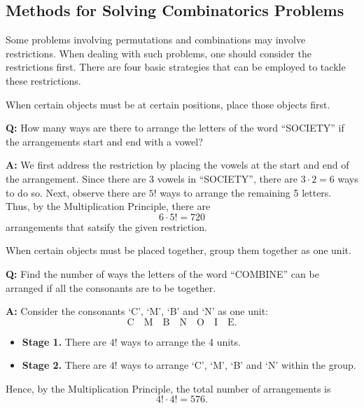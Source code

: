 \subsection{Methods for Solving Combinatorics Problems}

Some problems involving permutations and combinations may involve restrictions. When dealing with such problems, one should consider the restrictions first. There are four basic strategies that can be employed to tackle these restrictions.

\begin{method}
    When certain objects must be at certain positions, place those objects first.
\end{method}

\begin{example}
    \phantom{.}
    
    \textbf{Q:} How many ways are there to arrange the letters of the word ``SOCIETY'' if the arrangements start and end with a vowel?
    
    \textbf{A:} We first address the restriction by placing the vowels at the start and end of the arrangement. Since there are 3 vowels in ``SOCIETY'', there are $3 \cdot 2 = 6$ ways to do so. Next, observe there are $5!$ ways to arrange the remaining 5 letters. Thus, by the Multiplication Principle, there are \[6 \cdot 5! = 720\] arrangements that satsify the given restriction.
\end{example}

\begin{method}
    When certain objects must be placed together, group them together as one unit.
\end{method}

\begin{example}
    \phantom{.}

    \textbf{Q:} Find the number of ways the letters of the word ``COMBINE'' can be arranged if all the consonants are to be together.

    \textbf{A:} Consider the consonants `C', `M', `B' and `N' as one unit: \[\boxed{\text{C} \quad \text{M} \quad \text{B} \quad \text{N}} \quad \boxed{\text{O}} \quad \boxed{\text{I}} \quad \boxed{\text{E}}.\]
    \begin{itemize}
        \item \textbf{Stage 1.} There are $4!$ ways to arrange the 4 units.
        \item \textbf{Stage 2.} There are $4!$ ways to arrange `C', `M', `B' and `N' within the group.
    \end{itemize}
    Hence, by the Multiplication Principle, the total number of arrangements is \[4! \cdot 4! = 576.\]
\end{example}

